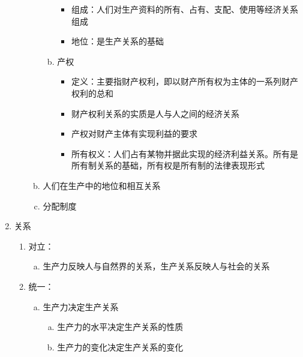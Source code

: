 \documentclass[12pt]{book}
\begin{document}
\begin{enumerate}[1.]
\begin{enumerate}[(1)]
\begin{enumerate}[a.]
\begin{enumerate}[(a)]
                                  \begin{itemize}
                                    \item 组成：人们对生产资料的所有、占有、支配、使用等经济关系组成
                                    \item 地位：是生产关系的基础
                                  \end{itemize}
                            \item 产权
                                  \begin{itemize}
                                    \item 定义：主要指财产权利，即以财产所有权为主体的一系列财产权利的总和
                                    \item 财产权利关系的实质是人与人之间的经济关系
                                    \item 产权对财产主体有实现利益的要求
                                    \item 所有权义：人们占有某物并据此实现的经济利益关系。所有是所有制关系的基础，所有权是所有制的法律表现形式
                                  \end{itemize}
                          \end{enumerate}
                    \item 人们在生产中的地位和相互关系
                    \item 分配制度
                  \end{enumerate}
          \end{enumerate}
    \item 关系
          \begin{enumerate}[(1)]
            \item 对立：
                  \begin{enumerate}[a.]
                    \item 生产力反映人与自然界的关系，生产关系反映人与社会的关系
                  \end{enumerate}
            \item  统一：
                  \begin{enumerate}[a.]
                    \item 生产力决定生产关系
                          \begin{enumerate}[(a)]
                            \item 生产力的水平决定生产关系的性质
                            \item 生产力的变化决定生产关系的变化

\end{enumerate}
\end{enumerate}
\end{enumerate}
\end{enumerate}
\end{document}
